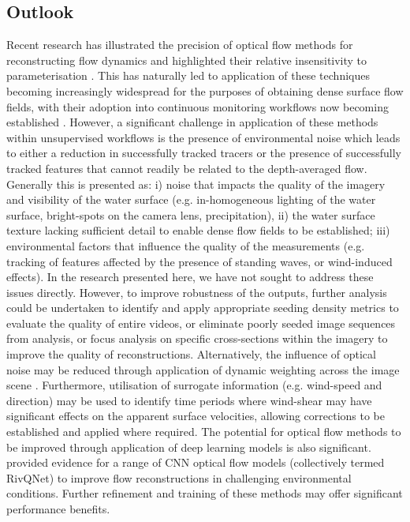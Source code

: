 \documentclass[hess, manuscript]{copernicus}
\begin{document}
\subsection{Outlook}
Recent research has illustrated the precision of optical flow methods for reconstructing flow dynamics and highlighted their relative insensitivity to parameterisation \citep{Pearce2020}. This has naturally led to application of these techniques becoming increasingly widespread for the purposes of obtaining dense surface flow fields, with their adoption into continuous monitoring workflows now becoming established \citep[e.g.][]{Hutley2023}. However, a significant challenge in application of these methods within unsupervised workflows is the presence of environmental noise which leads to either a reduction in successfully tracked tracers or the presence of successfully tracked features that cannot readily be related to the depth-averaged flow. Generally this is presented as: i) noise that impacts the quality of the imagery and visibility of the water surface (e.g. in-homogeneous lighting of the water surface, bright-spots on the camera lens, precipitation), ii) the water surface texture lacking sufficient detail to enable dense flow fields to be established; iii) environmental factors that influence the quality of the measurements (e.g. tracking of features affected by the presence of standing waves, or wind-induced effects). In the research presented here, we have not sought to address these issues directly. However, to improve robustness of the outputs, further analysis could be undertaken to identify and apply appropriate seeding density metrics to evaluate the quality of entire videos, or eliminate poorly seeded image sequences from analysis, or focus analysis on specific cross-sections within the imagery to improve the quality of reconstructions. Alternatively, the influence of optical noise may be reduced through application of dynamic weighting across the image scene \citep[e.g.][]{Cao2022}. Furthermore, utilisation of surrogate information (e.g. wind-speed and direction) may be used to identify time periods where wind-shear may have significant effects on the apparent surface velocities, allowing corrections to be established and applied where required. The potential for optical flow methods to be improved through application of deep learning models is also significant. \citet{Ansari2023} provided evidence for a range of CNN optical flow models (collectively termed RivQNet) to improve flow reconstructions in challenging environmental conditions. Further refinement and training of these methods may offer significant performance benefits. 
\end{document}
